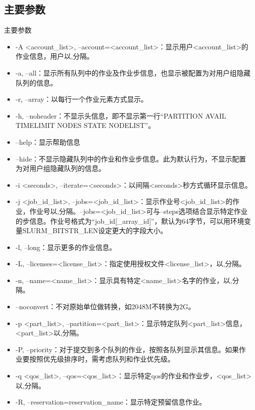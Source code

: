 \subsection{主要参数}
\begin{frame}[fragile]{主要参数}
\begin{itemize}
	\item -A <account\_list>, --account=<account\_list>：显示用户<account\_list>的作业信息，用户以,分隔。
	\item -a, --all：显示所有队列中的作业及作业步信息，也显示被配置为对用户组隐藏队列的信息。
	\item -r, --array：以每行一个作业元素方式显示。
	\item -h, --noheader：不显示头信息，即不显示第一行``PARTITION AVAIL  TIMELIMIT  NODES  STATE NODELIST''。
	\item --help：显示帮助信息
	\item --hide：不显示隐藏队列中的作业和作业步信息。此为默认行为，不显示配置为对用户组隐藏队列的信息。
	\item -i <seconds>, --iterate=<seconds>：以间隔<seconds>秒方式循环显示信息。
	\item -j <job\_id\_list>, --jobs=<job\_id\_list>：显示作业号<job\_id\_list>的作业，作业号以,分隔。--jobs=<job\_id\_list>可与--steps选项结合显示特定作业的步信息。作业号格式为``job\_id[\_array\_id]''，默认为64字节，可以用环境变量SLURM\_BITSTR\_LEN设定更大的字段大小。
	\item -l, --long：显示更多的作业信息。
	\item -L, --licenses=<license\_list>：指定使用授权文件<license\_list>，以,分隔。
	\item -n, --name=<name\_list>：显示具有特定<name\_list>名字的作业，以,分隔。
	\item --noconvert：不对原始单位做转换，如2048M不转换为2G。
	\item -p <part\_list>, --partition=<part\_list>：显示特定队列<part\_list>信息，<part\_list>以,分隔。
	\item -P, --priority：对于提交到多个队列的作业，按照各队列显示其信息。如果作业要按照优先级排序时，需考虑队列和作业优先级。
	\item -q <qos\_list>, --qos=<qos\_list>：显示特定qos的作业和作业步，<qos\_list>以,分隔。
	\item -R, --reservation=reservation\_name：显示特定预留信息作业。

\end{itemize}
\end{frame}
